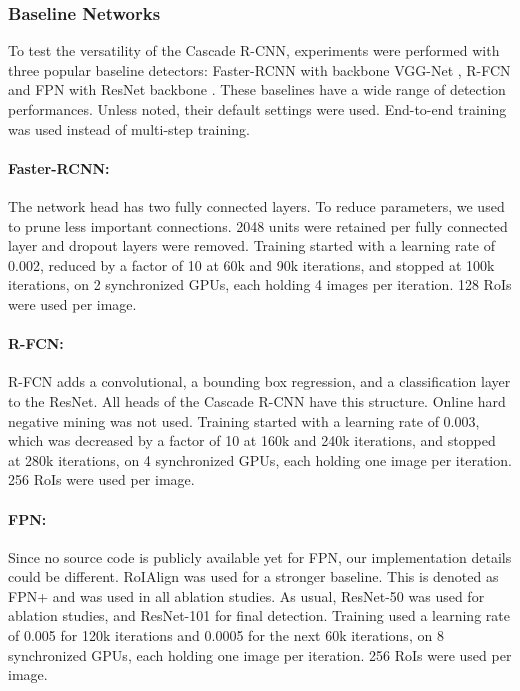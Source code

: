 \documentclass[10pt,twocolumn,letterpaper]{article}
\begin{document}

\subsubsection{Baseline Networks}
\label{subsubsec:baseline}

To test the versatility of the Cascade R-CNN, experiments were performed with three popular baseline detectors: Faster-RCNN with backbone VGG-Net \cite{DBLP:journals/corr/SimonyanZ14a}, R-FCN \cite{DBLP:conf/nips/DaiLHS16} and FPN \cite{lin2017feature} with ResNet backbone \cite{DBLP:conf/cvpr/HeZRS16}. These baselines have a wide range of detection performances. Unless noted, their default settings were used. End-to-end training was used instead of multi-step training.

\paragraph{Faster-RCNN:} The network head has two fully connected layers. To reduce parameters, we used \cite{DBLP:conf/nips/HanPTD15} to prune less important connections. 2048 units were retained per fully connected layer and dropout layers were removed. Training started with a learning rate of 0.002, reduced by a factor of 10 at 60k and 90k iterations, and stopped at 100k iterations, on 2 synchronized GPUs, each holding 4 images per iteration. 128 RoIs were used per image.

\paragraph{R-FCN:} R-FCN adds a convolutional, a bounding box regression, and a classification layer to the ResNet. All heads of the Cascade R-CNN have this structure. Online hard negative mining \cite{DBLP:conf/cvpr/ShrivastavaGG16} was not used. Training started with a learning rate of 0.003, which was decreased by a factor of 10 at 160k and 240k iterations, and stopped at 280k iterations, on 4 synchronized GPUs, each holding one image per iteration. 256 RoIs were used per image.

\paragraph{FPN:} Since no source code is publicly available yet for FPN, our implementation details could be different. RoIAlign \cite{he2017mask} was used for a stronger baseline. This is denoted as FPN+ and was used in all ablation studies. As usual, ResNet-50 was used for ablation studies, and ResNet-101 for final detection. Training used a learning rate of 0.005 for 120k
iterations and 0.0005 for the next 60k iterations, on 8 synchronized GPUs,
each holding one image per iteration. 256 RoIs were used per image.
\end{document}
